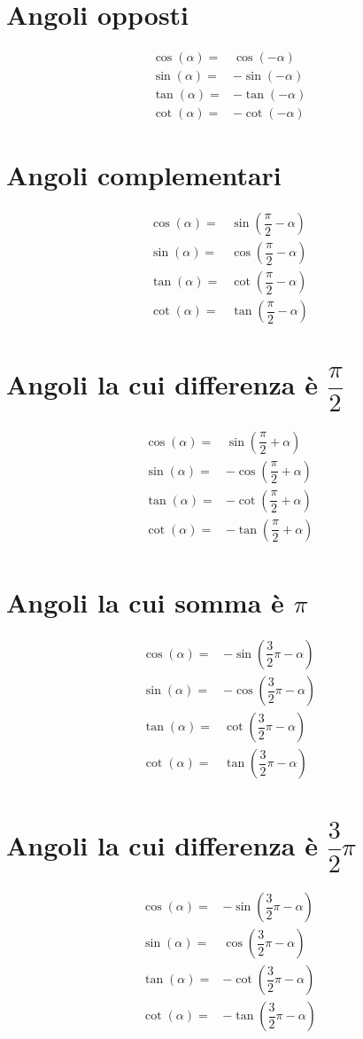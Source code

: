 \section{Angoli opposti}
\begin{align}
\cos(\alpha)=&\cos(-\alpha)\\
\sin(\alpha)=&-\sin(-\alpha)\\
\tan(\alpha)=&-\tan(-\alpha)\\
\cot(\alpha)=&-\cot(-\alpha)
\end{align}
\section{Angoli complementari}
\begin{align}
\cos(\alpha)=&\sin(\dfrac{\pi}{2}-\alpha)\\
\sin(\alpha)=&\cos(\dfrac{\pi}{2}-\alpha)\\
\tan(\alpha)=&\cot(\dfrac{\pi}{2}-\alpha)\\
\cot(\alpha)=&\tan(\dfrac{\pi}{2}-\alpha)\\
\end{align}
\section{Angoli la cui differenza è \texorpdfstring{$\dfrac{\pi}{2}$}{\textpi/2} }
\begin{align}
\cos(\alpha)=&\sin(\dfrac{\pi}{2}+\alpha)\\
\sin(\alpha)=&-\cos(\dfrac{\pi}{2}+\alpha)\\
\tan(\alpha)=&-\cot(\dfrac{\pi}{2}+\alpha)\\
\cot(\alpha)=&-\tan(\dfrac{\pi}{2}+\alpha)\\
\end{align}
\section{Angoli la cui somma è \texorpdfstring{$\pi$}{\textpi}}
\begin{align}
\cos(\alpha)=&-\sin(\dfrac{3}{2}\pi-\alpha)\\
\sin(\alpha)=&-\cos(\dfrac{3}{2}\pi-\alpha)\\
\tan(\alpha)=&\cot(\dfrac{3}{2}\pi-\alpha)\\
\cot(\alpha)=&\tan(\dfrac{3}{2}\pi-\alpha)\\
\end{align}
\section{Angoli la cui differenza è \texorpdfstring{$\dfrac{3}{2}\pi$}{3/2 \textpi}}
\begin{align} 
\cos(\alpha)=&-\sin(\dfrac{3}{2}\pi-\alpha)\\
\sin(\alpha)=&\cos(\dfrac{3}{2}\pi-\alpha)\\
\tan(\alpha)=&-\cot(\dfrac{3}{2}\pi-\alpha)\\
\cot(\alpha)=&-\tan(\dfrac{3}{2}\pi-\alpha)\\
\end{align}
